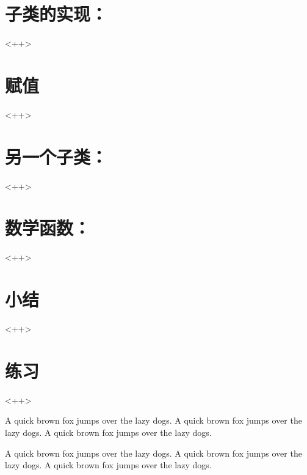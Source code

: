 \section{子类的实现：}<++>

\section{赋值}<++>

\section{另一个子类：}<++>

\section{数学函数：}<++>

\section{小结}<++>

\section{练习}<++>

A quick brown fox jumps over the lazy dogs.
A quick brown fox jumps over the lazy dogs.
A quick brown fox jumps over the lazy dogs.

A quick brown fox jumps over the lazy dogs.
A quick brown fox jumps over the lazy dogs.
A quick brown fox jumps over the lazy dogs.


